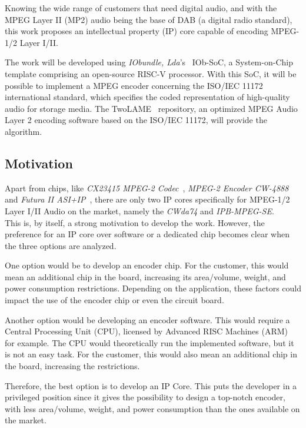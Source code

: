 Knowing the wide range of customers that need digital audio, and with the MPEG Layer II (MP2) audio being the base of DAB (a digital radio standard), this work proposes an intellectual property (IP) core capable of encoding MPEG-1/2 Layer I/II. 

The work will be developed using \textit{IObundle, Lda}'s~\cite{iobundle} IOb-SoC, a System-on-Chip template comprising an open-source RISC-V processor. 
With this SoC, it will be possible to implement a MPEG encoder concerning the ISO/IEC 11172 international standard, which specifies the coded representation of high-quality audio for storage media. The TwoLAME~\cite{twolame} repository, an optimized MPEG Audio Layer 2 encoding software based on the ISO/IEC 11172, will provide the algorithm.

\subsection{Motivation}
Apart from chips, like \textit{CX23415 MPEG-2 Codec}~\cite{cx23415}, \textit{MPEG-2 Encoder CW-4888}~\cite{cw4888} and \textit{Futura II ASI+IP}~\cite{futura}, there are only two IP cores specifically for MPEG-1/2 Layer I/II Audio on the market, namely the \textit{CWda74} and \textit{IPB-MPEG-SE}.\\
This is, by itself, a strong motivation to develop the work. However, the preference for an IP core over software or a dedicated chip becomes clear when the three options are analyzed.

One option would be to develop an encoder chip. For the customer, this would mean an additional chip in the board, increasing its area/volume, weight, and power consumption restrictions. Depending on the application, these factors could impact the use of the encoder chip or even the circuit board.

Another option would be developing an encoder software. This would require a Central Processing Unit (CPU), licensed by Advanced RISC Machines (ARM)~\cite{arm} for example. The CPU would theoretically run the implemented software, but it is not an easy task. For the customer, this would also mean an additional chip in the board, increasing the restrictions.

Therefore, the best option is to develop an IP Core. This puts the developer in a privileged position since it gives the possibility to design a top-notch encoder, with less area/volume, weight, and power consumption than the ones available on the market.

